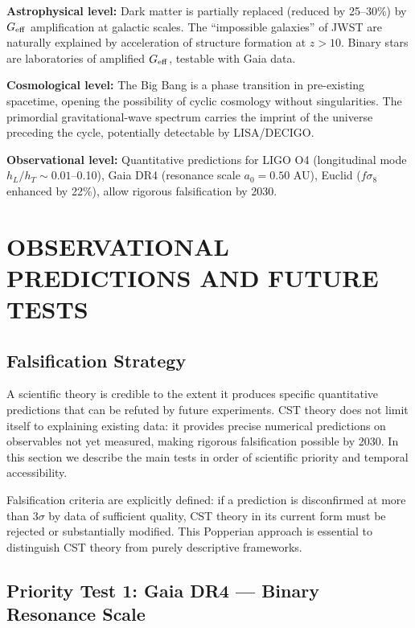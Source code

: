 \documentclass[11pt,a4paper]{article}
\begin{document}
\textbf{Astrophysical level:} Dark matter is partially replaced (reduced
by 25--30\%) by \(G_{\rm eff}\) amplification at galactic scales. The
``impossible galaxies'' of JWST are naturally explained by acceleration
of structure formation at \(z > 10\). Binary stars are laboratories of
amplified \(G_{\rm eff}\), testable with Gaia data.

\textbf{Cosmological level:} The Big Bang is a phase transition in
pre-existing spacetime, opening the possibility of cyclic cosmology
without singularities. The primordial gravitational-wave spectrum
carries the imprint of the universe preceding the cycle, potentially
detectable by LISA/DECIGO.

\textbf{Observational level:} Quantitative predictions for LIGO O4
(longitudinal mode \(h_L/h_T \sim 0.01\)--0.10), Gaia DR4 (resonance
scale \(a_0 = 0.50\) AU), Euclid (\(f\sigma_8\) enhanced by 22\%), allow
rigorous falsification by 2030.

\hypertarget{observational-predictions-and-future-tests}{%
\section{OBSERVATIONAL PREDICTIONS AND FUTURE
TESTS}\label{observational-predictions-and-future-tests}}

\hypertarget{falsification-strategy}{%
\subsection{Falsification
Strategy}\label{falsification-strategy}}

A scientific theory is credible to the extent it produces specific
quantitative predictions that can be refuted by future experiments. CST
theory does not limit itself to explaining existing data: it provides
precise numerical predictions on observables not yet measured, making
rigorous falsification possible by 2030. In this section we describe the
main tests in order of scientific priority and temporal accessibility.

Falsification criteria are explicitly defined: if a prediction is
disconfirmed at more than \(3\sigma\) by data of sufficient quality, CST
theory in its current form must be rejected or substantially modified.
This Popperian approach is essential to distinguish CST theory from
purely descriptive frameworks.

\hypertarget{priority-test-1-gaia-dr4-binary-resonance-scale}{%
\subsection{Priority Test 1: Gaia DR4 --- Binary Resonance
Scale}\label{priority-test-1-gaia-dr4-binary-resonance-scale}}
\end{document}
